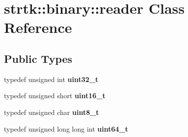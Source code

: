 \hypertarget{classstrtk_1_1binary_1_1reader}{\section{strtk\-:\-:binary\-:\-:reader Class Reference}
\label{classstrtk_1_1binary_1_1reader}
}
\subsection*{Public Types}
\begin{DoxyCompactItemize}
\item 
\hypertarget{classstrtk_1_1binary_1_1reader_a878224e30c5be36f878dd15343d4f032}{typedef unsigned int {\bfseries uint32\-\_\-t}}\label{classstrtk_1_1binary_1_1reader_a878224e30c5be36f878dd15343d4f032}

\item 
\hypertarget{classstrtk_1_1binary_1_1reader_aa9814f877763e85063450ed021f0bd79}{typedef unsigned short {\bfseries uint16\-\_\-t}}\label{classstrtk_1_1binary_1_1reader_aa9814f877763e85063450ed021f0bd79}

\item 
\hypertarget{classstrtk_1_1binary_1_1reader_a39cf201b4b2c9afb0f8eba4b4378c224}{typedef unsigned char {\bfseries uint8\-\_\-t}}\label{classstrtk_1_1binary_1_1reader_a39cf201b4b2c9afb0f8eba4b4378c224}

\item 
\hypertarget{classstrtk_1_1binary_1_1reader_a840b0bd951884045986de7cdbce881c7}{typedef unsigned long long int {\bfseries uint64\-\_\-t}}\label{classstrtk_1_1binary_1_1reader_a840b0bd951884045986de7cdbce881c7}

\end{DoxyCompactItemize}
